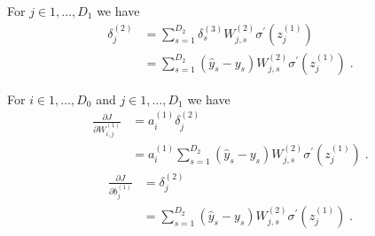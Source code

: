 \documentclass{article}
\begin{document}
For $j \in {1,\dots,D_{1}}$ we have
\begin{align*}
\delta^{(2)}_{j} & = \sum_{s=1}^{D_{2}}\delta^{(3)}_{s}W^{(2)}_{j,s} \sigma^{\prime} (z^{(1)}_{j})\\
& = \sum_{s=1}^{D_{2}}(\hat{y}_{s} - y_{s})W^{(2)}_{j,s}\sigma^{\prime} (z^{(1)}_{j})\; .
\end{align*}

For $i \in {1,\dots,D_{0}}$ and $j \in {1,\dots,D_{1}}$ we have
\begin{align*}
\frac{\partial J}{\partial W^{(1)}_{i,j}} & = a^{(1)}_{i}\delta^{(2)}_{j}\\
& = a^{(1)}_{i}\sum_{s=1}^{D_{2}}(\hat{y}_{s} - y_{s})W^{(2)}_{j,s}\sigma^{\prime} (z^{(1)}_{j})\; .
\end{align*}
\begin{align*}
\frac{\partial J}{\partial b^{(1)}_{j}} & = \delta^{(2)}_{j}\\
& = \sum_{s=1}^{D_{2}}(\hat{y}_{s} - y_{s})W^{(2)}_{j,s}\sigma^{\prime} (z^{(1)}_{j})\; .
\end{align*}
\end{document}
